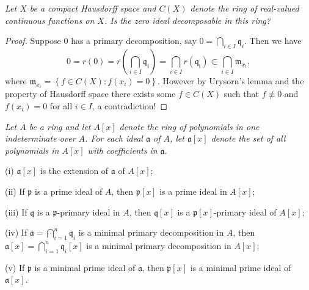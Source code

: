 \begin{problem}\em
Let $X$ be a compact Hausdorff space and $C(X)$ denote the ring of real-valued continuous functions on $X$. Is the zero ideal decomposable in this ring?
\end{problem}
\begin{proof}
Suppose $0$ has a primary decomposition, say $0=\bigcap_{i\in I}\mathfrak{q}_i$. Then we have 
$$
0=r\left( 0 \right) =r\left( \bigcap_{i\in I}{\mathfrak{q} _i} \right) =\bigcap_{i\in I}{r\left( \mathfrak{q} _{\mathfrak{i}} \right)}\subset \bigcap_{i\in I}{\mathfrak{m} _{x_i}},
$$
where $\mathfrak{m} _{x_i}=\left\{ f\in C\left( X \right) :f\left( x_i \right) =0 \right\} $. However by Urysorn's lemma and the property of Hausdorff space there exists some $f\in C(X)$ such that $f\not\equiv 0$ and $f(x_i)=0$ for all $i\in I$, a contradiction!
\end{proof}
\begin{problem}\em
Let $A$ be a ring and let $A[x]$ denote the ring of polynomials in one indeterminate over $A$. For each ideal $\mathfrak{a}$ of $A$, let $\mathfrak{a}[x]$ denote the set of all polynomials in $A[x]$ with coefficients in $\mathfrak{a}$.\par
(i) $\mathfrak{a}[x]$ is the extension of $\mathfrak{a}$ of $A[x]$;\par
(ii) If $\mathfrak{p}$ is a prime ideal of $A$, then $\mathfrak{p}[x]$ is a prime ideal in $A[x]$;\par
(iii) If $\mathfrak{q}$ is a $\mathfrak{p}$-primary ideal in $A$, then $\mathfrak{q}[x]$ is a $\mathfrak{p}[x]$-primary ideal of $A[x]$;\par
(iv) If $\mathfrak{a}=\bigcap_{i=1}^n\mathfrak{q}_i$ is a minimal primary decomposition in $A$, then $\mathfrak{a}[x]=\bigcap_{i=1}^n\mathfrak{q}_i[x]$ is a minimal primary decomposition in $A[x]$;\par
(v) If $\mathfrak{p}$ is a minimal prime ideal of $\mathfrak{a}$, then $\mathfrak{p}[x]$ is a minimal prime ideal of $\mathfrak{a}[x]$.
\end{problem}
